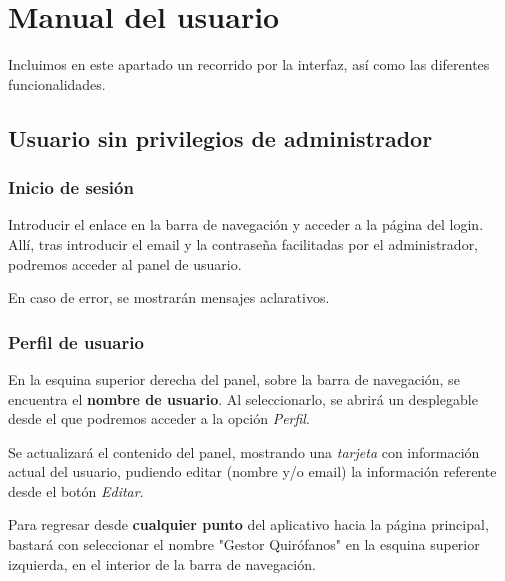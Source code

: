 \section{Manual del usuario}

Incluimos en este apartado un recorrido por la interfaz, así como las diferentes funcionalidades.

\subsection{Usuario sin privilegios de administrador}

\subsubsection{Inicio de sesión}

Introducir el enlace en la barra de navegación y acceder a la página del login. Allí, tras introducir el email y la contraseña facilitadas por el administrador, podremos acceder al panel de usuario.

En caso de error, se mostrarán mensajes aclarativos.



\subsubsection{Perfil de usuario}

En la esquina superior derecha del panel, sobre la barra de navegación, se encuentra el \textbf{nombre de usuario}. Al seleccionarlo, se abrirá un desplegable desde el que podremos acceder a la opción \textit{Perfil}.


Se actualizará el contenido del panel, mostrando una \textit{tarjeta} con información actual del usuario, pudiendo editar (nombre y/o email) la información referente desde el botón \textit{Editar}.


Para regresar desde \textbf{cualquier punto} del aplicativo hacia la página principal, bastará con seleccionar el nombre "Gestor Quirófanos" en la esquina superior izquierda, en el interior de la barra de navegación.

